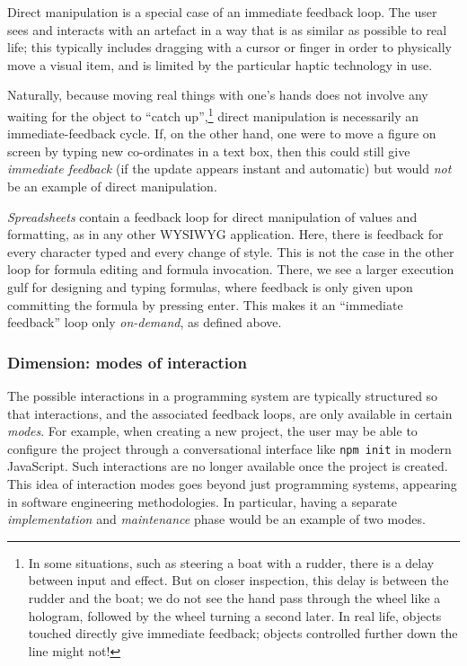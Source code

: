 \documentclass[english,submission]{programming}
\begin{document}
Direct manipulation \cite{DirectManip} is a special case of an immediate
feedback loop. The user sees and interacts with an artefact in a way
that is as similar as possible to real life; this typically includes
dragging with a cursor or finger in order to physically move a visual
item, and is limited by the particular haptic technology in use.

Naturally, because moving real things with one's hands does not involve
any waiting for the object to ``catch up'',\footnote{In some situations,
  such as steering a boat with a rudder, there is a delay between input
  and effect. But on closer inspection, this delay is between the rudder
  and the boat; we do not see the hand pass through the wheel like a
  hologram, followed by the wheel turning a second later. In real life,
  objects touched directly give immediate feedback; objects controlled
  further down the line might not!} direct manipulation is necessarily
an immediate-feedback cycle. If, on the other hand, one were to move a
figure on screen by typing new co-ordinates in a text box, then this
could still give \emph{immediate feedback} (if the update appears
instant and automatic) but would \emph{not} be an example of direct
manipulation.

\emph{Spreadsheets} contain a feedback loop for direct manipulation of
values and formatting, as in any other WYSIWYG application. Here, there
is feedback for every character typed and every change of style. This is
not the case in the other loop for formula editing and formula
invocation. There, we see a larger execution gulf for designing and
typing formulas, where feedback is only given upon committing the
formula by pressing enter. This makes it an ``immediate feedback'' loop
only \emph{on-demand}, as defined above.

\hypertarget{dimension-modes-of-interaction}{%
\subsubsection{Dimension: modes of
interaction}\label{dimension-modes-of-interaction}}

The possible interactions in a programming system are typically
structured so that interactions, and the associated feedback loops, are
only available in certain \emph{modes}. For example, when creating a new
project, the user may be able to configure the project through a
conversational interface like \texttt{npm\ init} in modern JavaScript.
Such interactions are no longer available once the project is created.
This idea of interaction modes goes beyond just programming systems,
appearing in software engineering methodologies. In particular, having a
separate \emph{implementation} and \emph{maintenance} phase would be an
example of two modes.
\end{document}
